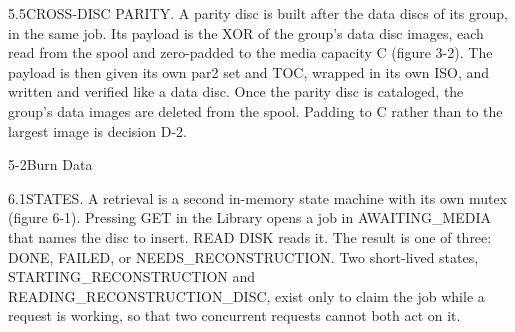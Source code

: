 \documentclass[handbook]{nasa-handbook}
\begin{document}
\begin{nhpara}{5.5}{CROSS-DISC PARITY.}
A parity disc is built after the data discs of its group, in the same job. Its payload is the XOR of the group's data disc images, each read from the spool and zero-padded to the media capacity C (figure 3-2). The payload is then given its own par2 set and TOC, wrapped in its own ISO, and written and verified like a data disc. Once the parity disc is cataloged, the group's data images are deleted from the spool. Padding to C rather than to the largest image is decision D-2.
\end{nhpara}

\begin{nhtable}{5-2}{Burn Data}
\end{nhtable}


\begin{nhpara}{6.1}{STATES.}
A retrieval is a second in-memory state machine with its own mutex (figure 6-1). Pressing GET in the Library opens a job in AWAITING\_MEDIA that names the disc to insert. READ DISK reads it. The result is one of three: DONE, FAILED, or NEEDS\_RECONSTRUCTION. Two short-lived states, STARTING\_RECONSTRUCTION and READING\_RECONSTRUCTION\_DISC, exist only to claim the job while a request is working, so that two concurrent requests cannot both act on it.
\end{nhpara}
\end{document}
